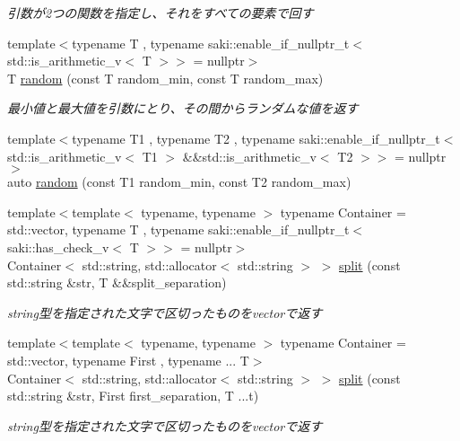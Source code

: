 \begin{DoxyCompactItemize}
\begin{DoxyCompactList}\small\item\em 引数が2つの関数を指定し、それをすべての要素で回す \end{DoxyCompactList}\item 
{\footnotesize template$<$typename T , typename saki\+::enable\+\_\+if\+\_\+nullptr\+\_\+t$<$ std\+::is\+\_\+arithmetic\+\_\+v$<$ T $>$$>$  = nullptr$>$ }\\T \mbox{\hyperlink{namespacesaki_adec39fdef417fa75fb6a6bd06b08490c}{random}} (const T random\+\_\+min, const T random\+\_\+max)
\begin{DoxyCompactList}\small\item\em 最小値と最大値を引数にとり、その間からランダムな値を返す \end{DoxyCompactList}\item 
{\footnotesize template$<$typename T1 , typename T2 , typename saki\+::enable\+\_\+if\+\_\+nullptr\+\_\+t$<$ std\+::is\+\_\+arithmetic\+\_\+v$<$ T1 $>$ \&\&std\+::is\+\_\+arithmetic\+\_\+v$<$ T2 $>$$>$  = nullptr$>$ }\\auto \mbox{\hyperlink{namespacesaki_a8a3d0c8d244f1f8e5c6c8310f7e7b647}{random}} (const T1 random\+\_\+min, const T2 random\+\_\+max)
\item 
{\footnotesize template$<$template$<$ typename, typename $>$ typename Container = std\+::vector, typename T , typename saki\+::enable\+\_\+if\+\_\+nullptr\+\_\+t$<$ saki\+::has\+\_\+check\+\_\+v$<$ T $>$$>$  = nullptr$>$ }\\Container$<$ std\+::string, std\+::allocator$<$ std\+::string $>$ $>$ \mbox{\hyperlink{namespacesaki_ad15185db28f6e77d65411ca83f64f5bb}{split}} (const std\+::string \&str, T \&\&split\+\_\+separation)
\begin{DoxyCompactList}\small\item\em string型を指定された文字で区切ったものをvectorで返す \end{DoxyCompactList}\item 
{\footnotesize template$<$template$<$ typename, typename $>$ typename Container = std\+::vector, typename First , typename ... T$>$ }\\Container$<$ std\+::string, std\+::allocator$<$ std\+::string $>$ $>$ \mbox{\hyperlink{namespacesaki_ac1464436ac78ade2ba14371e2efe1fd2}{split}} (const std\+::string \&str, First first\+\_\+separation, T ...t)
\begin{DoxyCompactList}\small\item\em string型を指定された文字で区切ったものをvectorで返す \end{DoxyCompactList}\item 

\end{DoxyCompactItemize}
